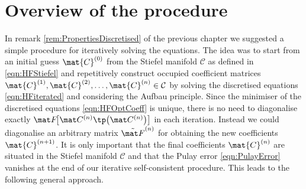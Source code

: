\section{Overview of the \SCF procedure}
In remark \ref{rem:PropertiesDiscretised}
of the previous chapter
we suggested a simple procedure for iteratively solving the \HF equations.
The idea was to start from an initial guess $\mat{C}^{(0)}$
from the Stiefel manifold $\mathcal{C}$ as defined in \eqref{eqn:HFStiefel}
and repetitively construct occupied coefficient
matrices $\mat{C}^{(1)}, \mat{C}^{(2)}, \ldots, \mat{C}^{(n)} \in \mathcal{C}$
by solving the discretised \HF equations \eqref{eqn:HFiterated}
and considering the Aufbau principle.
Since the minimiser of the discretised \HF equations \eqref{eqn:HFOptCoeff}
is unique, there is no need to diagonalise exactly $\matFnfull$ in each iteration.
Instead we could diagonalise an arbitrary matrix $\matFnt$
for obtaining the new coefficients $\mat{C}^{(n+1)}$.
It is only important that the final coefficients $\mat{C}^{(n)}$ are situated
in the Stiefel manifold $\mathcal{C}$
and that the Pulay error \eqref{eqn:PulayError}
vanishes at the end of our iterative self-consistent procedure.
This leads to the following general approach.

